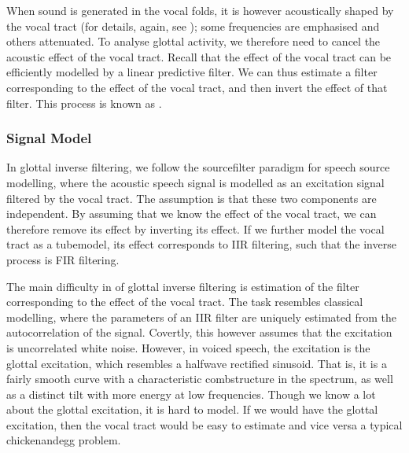 \documentclass[letterpaper,10pt,english]{jupyterBook}
\begin{document}
\sphinxAtStartPar
When sound is generated in the vocal folds, it is however acoustically
shaped by the vocal tract (for details, again, see );
some frequencies are emphasised and others attenuated. To analyse
glottal activity, we therefore need to cancel the acoustic effect of the
vocal tract. Recall that the effect of the vocal tract can be
efficiently modelled by a linear predictive filter. We can thus estimate
a filter corresponding to the effect of the vocal tract, and then invert
the effect of that filter. This process is known as .


\subsubsection{Signal Model}
\label{\detokenize{Analysis/Inverse_filtering_for_glottal_activity_estimation:signal-model}}
\sphinxAtStartPar
In glottal inverse filtering, we follow the source\sphinxhyphen{}filter paradigm for
speech source modelling, where the acoustic speech signal is modelled as
an excitation signal filtered by the vocal tract. The assumption is that
these two components are independent. By assuming that we know the
effect of the vocal tract, we can therefore remove its effect by
inverting its effect. If we further model the vocal tract as a
tube\sphinxhyphen{}model, its effect corresponds to IIR filtering, such that the
inverse process is FIR filtering.

\sphinxAtStartPar
The main difficulty in of glottal inverse filtering is estimation of the
filter corresponding to the effect of the vocal tract. The task
resembles classical  modelling,
where the parameters of an IIR filter are uniquely estimated from the
autocorrelation of the signal. Covertly, this however assumes that the
excitation is uncorrelated white noise. However, in voiced speech, the
excitation is the glottal excitation, which resembles a half\sphinxhyphen{}wave
rectified sinusoid. That is, it is a fairly smooth curve with a
characteristic comb\sphinxhyphen{}structure in the spectrum, as well as a distinct
tilt with more energy at low frequencies. Though we know a lot about the
glottal excitation, it is hard to model. If we would have the glottal
excitation, then the vocal tract would be easy to estimate and vice
versa \sphinxhyphen{} a typical chicken\sphinxhyphen{}and\sphinxhyphen{}egg problem.
\end{document}
